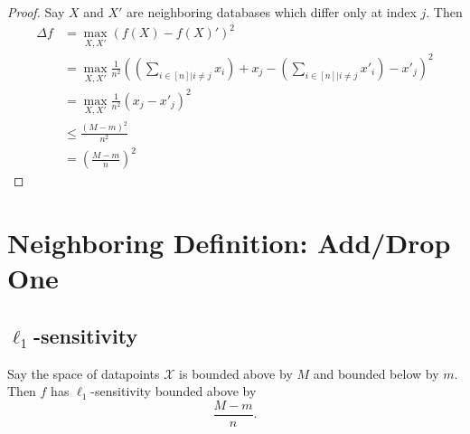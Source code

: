\documentclass[11pt]{scrartcl} %
\begin{document}
\begin{proof}
	Say $X$ and $X'$ are neighboring databases which differ only at index $j$. Then
	\begin{align*}
		\Delta{f} &= \max_{X,X'} (f(X) - f(X)')^2 \\
						&= \max_{X,X'} \frac{1}{n^2} \left(
								\left( \sum_{i \in [n] | i \neq j} x_i \right) + x_j -
								\left( \sum_{i \in [n] | i \neq j} x'_i \right) - x'_j
							\right)^2 \\
						&= \max_{X,X'} \frac{1}{n^2} (x_j - x'_j)^2 \\
						&\leq \frac{(M-m)^2}{n^2} \\
						&= \left( \frac{M-m}{n} \right)^2
	\end{align*}
\end{proof}

\section{Neighboring Definition: Add/Drop One}
\subsection{$\ell_1$-sensitivity}

\begin{theorem}
Say the space of datapoints $\mathcal{X}$ is bounded above by $M$ and bounded below by $m$.
Then $f$ has $\ell_1$-sensitivity bounded above by
$$ \frac{M-m}{n}. $$
\end{theorem}
\end{document}
